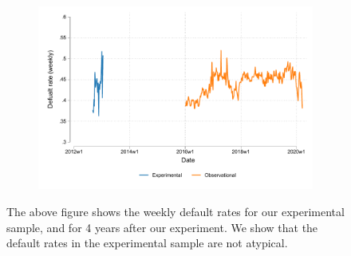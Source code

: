 \begin{appendix}
\begin{figure}[H]
    \caption{Weekly default rates experimental branches and all branches}
    \label{external_validity}
    \begin{center}
    \begin{subfigure}{0.65\textwidth}
        \centering
        \includegraphics[width=\textwidth]{Figuras/weekly_def_rates.pdf}
    \end{subfigure}
    \end{center}
\footnotesize{The above figure shows the weekly default rates for our experimental sample, and for 4 years after our experiment. We show that the default rates in the experimental sample are not atypical. }
    \label{weekly_def_rates}
\end{figure}


\normalsize
\normalsize



\end{appendix}
